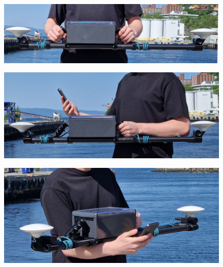 \begin{figure}[H]
    \centering
    \includegraphics[width=\textwidth]{figures/ergonomics/dual_from_front.jpg}
\end{figure}
\begin{figure}[H]
    \centering
    \includegraphics[width=\textwidth]{figures/ergonomics/single_hand.jpg}
\end{figure}
\begin{figure}[H]
    \centering
    \includegraphics[width=\textwidth]{figures/ergonomics/holding_phone.jpg}
\end{figure}
